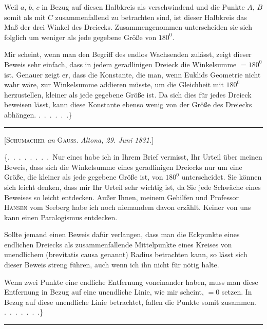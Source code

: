 

%
Weil $a$, $b$, $c$ in Bezug auf diesen Halbkreis als verschwindend und die Punkte $A$, $B$ somit als mit $C$ zusammenfallend zu betrachten sind, ist dieser Halbkreis das Maß der drei Winkel des Dreiecks. Zusammengenommen unterscheiden sie sich folglich um weniger als jede gegebene Größe von $180^0$.

Mir scheint, wenn man den Begriff des endlos Wachsenden zulässt, zeigt dieser Beweis sehr einfach, dass in jedem  geradlinigen Dreieck die Winkelsumme $=180^0$ ist. Genauer zeigt er, dass die Konstante, die man, wenn Euklids Geometrie nicht wahr wäre, zur Winkelsumme addieren müsste, um die Gleichheit mit $180^0$ herzustellen, kleiner als jede gegebene Größe ist. Da sich dies für jedes Dreieck beweisen lässt, kann diese Konstante ebenso wenig von der Größe des Dreiecks abhängen. \mbox{.\ .\ .\ .\ .\ .}\}

\bigskip
\hrule
\bigskip

\begin{center}
[\textsc{Schumacher} \emph{an} \textsc{Gauss}. \emph{Altona, 29. Juni 1831.}]
\end{center}

\{\mbox{.\ .\ .\ .\ .\ .}\ .\ .\ Nur eines habe ich in Ihrem Brief vermisst, Ihr Urteil über meinen Beweis, dass sich die Winkelsumme eines geradlinigen Dreiecks nur um eine Größe, die kleiner als jede gegebene Größe ist, von $180^0$ unterscheidet. Sie können sich leicht denken, dass mir Ihr Urteil sehr wichtig ist, da Sie jede Schwäche eines Beweises so leicht entdecken. Außer Ihnen, meinem Gehilfen und Professor \textsc{Hansen} vom Seeberg habe ich noch niemandem davon erzählt. Keiner von uns kann einen Paralogismus entdecken.

Sollte jemand einen Beweis dafür verlangen, dass man die Eckpunkte eines endlichen Dreiecks als zusammenfallende Mittelpunkte eines Kreises von unendlichem (brevitatis causa  genannt) Radius betrachten kann, so lässt sich dieser Beweis streng führen, auch wenn ich ihn nicht für nötig halte.

Wenn zwei Punkte eine endliche Entfernung voneinander haben, muss man diese Entfernung in Bezug auf eine unendliche Linie, wie mir scheint, $=0$ setzen. In Bezug auf diese unendliche Linie betrachtet, fallen die Punkte somit zusammen. \mbox{.\ .\ .\ .\ .\ .}\ .\}

\bigskip
\hrule
\bigskip

